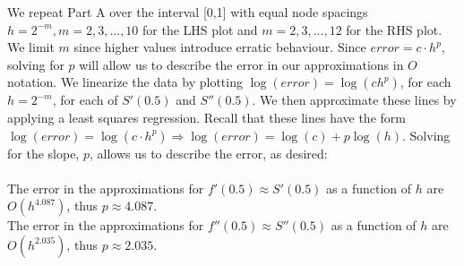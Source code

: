\documentclass[11pt, oneside]{article}   	%
\begin{document}
We repeat Part A over the interval [0,1] with equal node spacings $h = 2^{-m}, m = 2, 3, ..., 10$ for the LHS plot and $m = 2, 3, ..., 12$ for the RHS plot. We limit $m$ since higher values introduce erratic behaviour. Since $error = c \cdot h^p$, solving for $p$ will allow us to describe the error in our approximations in $O$ notation. We linearize the data by plotting $\log(error) = \log (ch^p)$, for each $h = 2^{-m}$, for each of $S'(0.5)$ and $S''(0.5)$. We then approximate these lines by applying a least squares regression. Recall that these lines have the form $\log(error) = \log (c \cdot h^p) \Rightarrow \log(error) = \log(c) + p \log(h)$. Solving for the slope, $p$, allows us to describe the error, as desired:\\
$~$\\
The error in the approximations for $f'(0.5) \approx S'(0.5)$ as a function of $h$ are $O(h^{4.087})$, thus $p \approx 4.087$.\\
The error in the approximations for $f''(0.5) \approx S''(0.5)$ as a function of $h$ are $O(h^{2.035})$, thus $p \approx 2.035$.\\
\end{document}
